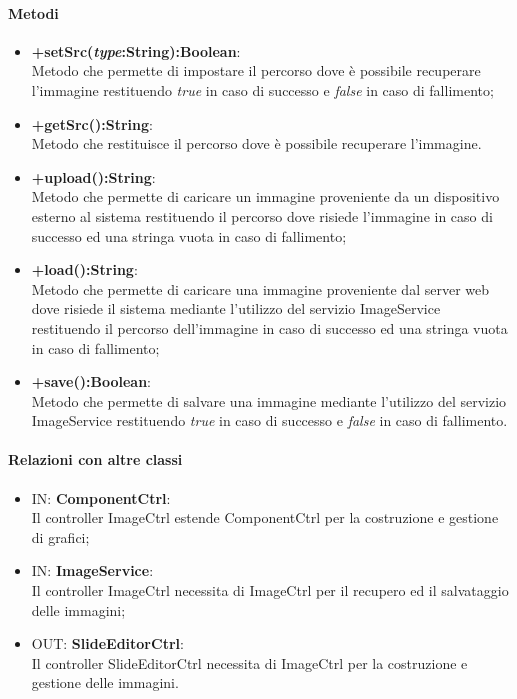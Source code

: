 	\paragraph{Metodi}
	\begin{itemize}
	\item \textbf{+setSrc(\textit{type}:String):Boolean}:\\
		Metodo che permette di impostare il percorso dove è possibile recuperare l'immagine restituendo \textit{true} in caso di successo e \textit{false} in caso di fallimento;
	\item \textbf{+getSrc():String}:\\
		Metodo che restituisce il percorso dove è possibile recuperare l'immagine.
	\item \textbf{+upload():String}:\\	
		Metodo che permette di caricare un immagine proveniente da un dispositivo esterno al sistema restituendo il percorso dove risiede l'immagine in caso di successo ed una stringa vuota in caso di fallimento;
	\item \textbf{+load():String}:\\	
		Metodo che permette di caricare una immagine proveniente dal server web dove risiede il sistema mediante l'utilizzo del servizio ImageService restituendo il percorso dell'immagine in caso di successo ed una stringa vuota in caso di fallimento;
	\item \textbf{+save():Boolean}:\\	
		Metodo che permette di salvare una immagine mediante l'utilizzo del servizio ImageService restituendo \textit{true} in caso di successo e \textit{false} in caso di fallimento.
	\end{itemize}
	\paragraph{Relazioni con altre classi}
	\begin{itemize}
 	\item IN: \textbf{ComponentCtrl}:\\
	 	Il controller ImageCtrl estende ComponentCtrl per la costruzione e gestione di grafici;
	\item IN: \textbf{ImageService}:\\
		Il controller ImageCtrl necessita di ImageCtrl per il recupero ed il salvataggio delle immagini;
	\item OUT: \textbf{SlideEditorCtrl}:\\
		Il controller SlideEditorCtrl necessita di ImageCtrl per la costruzione e gestione delle immagini. 	
	\end{itemize}

